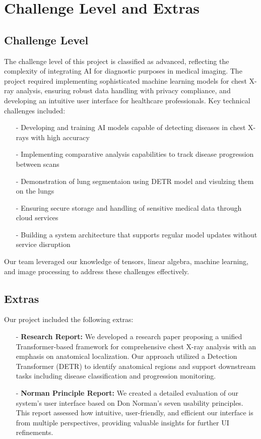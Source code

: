 \documentclass{article}
\begin{document}
\section{Challenge Level and Extras}

\subsection{Challenge Level}

The challenge level of this project is classified as advanced, reflecting the complexity of integrating AI for diagnostic purposes in medical imaging. The project required implementing sophisticated machine learning models for chest X-ray analysis, ensuring robust data handling with privacy compliance, and developing an intuitive user interface for healthcare professionals.
\newline
Key technical challenges included:
\begin{itemize}
    \item[-] Developing and training AI models capable of detecting diseases in chest X-rays with high accuracy
    \item[-] Implementing comparative analysis capabilities to track disease progression between scans
    \item[-] Demonstration of lung segmentaion using DETR model and visulzing them on the lungs
    \item[-] Ensuring secure storage and handling of sensitive medical data through cloud services
    \item[-] Building a system architecture that supports regular model updates without service disruption
\end{itemize}

\noindent Our team leveraged our knowledge of tensors, linear algebra, machine learning, and image processing to address these challenges effectively.


\subsection{Extras}

Our project included the following extras:

\begin{itemize}
    \item[-] \textbf{Research Report:} We developed a research paper proposing a unified Transformer-based framework for comprehensive chest X-ray analysis with an emphasis on anatomical localization. Our approach utilized a Detection Transformer (DETR) to identify anatomical regions and support downstream tasks including disease classification and progression monitoring.
    
    \item[-] \textbf{Norman Principle Report:} We created a detailed evaluation of our system's user interface based on Don Norman's seven usability principles. This report assessed how intuitive, user-friendly, and efficient our interface is from multiple perspectives, providing valuable insights for further UI refinements.

\end{itemize}
\end{document}
